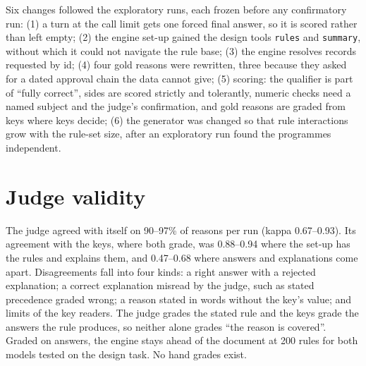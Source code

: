 \documentclass[11pt]{article}
\begin{document}
Six changes followed the exploratory runs, each frozen before any confirmatory run: (1) a turn at the call limit gets
one forced final answer, so it is scored rather than left empty; (2) the engine set-up gained the design tools
\texttt{rules} and \texttt{summary}, without which it could not navigate the rule base; (3) the engine resolves
records requested by id; (4) four gold reasons were rewritten, three because they asked for a dated approval chain
the data cannot give; (5) scoring: the qualifier is part of ``fully correct'', sides are scored strictly and
tolerantly, numeric checks need a named subject and the judge's confirmation, and gold reasons are graded from keys
where keys decide; (6) the generator was changed so that rule interactions grow with the rule-set size, after an
exploratory run found the programmes independent.

\section{Judge validity}
\label{app:judge}

The judge agreed with itself on 90--97\% of reasons per run (kappa 0.67--0.93). Its agreement with the keys, where
both grade, was 0.88--0.94 where the set-up has the rules and explains them, and 0.47--0.68 where answers and
explanations come apart. Disagreements fall into four kinds: a right answer with a rejected explanation; a correct
explanation misread by the judge, such as stated precedence graded wrong; a reason stated in words without the
key's value; and limits of the key readers. The judge grades the stated rule and the keys grade the answers the rule
produces, so neither alone grades ``the reason is covered''. Graded on answers, the engine stays ahead of the
document at 200 rules for both models tested on the design task. No hand grades exist.



\end{document}
